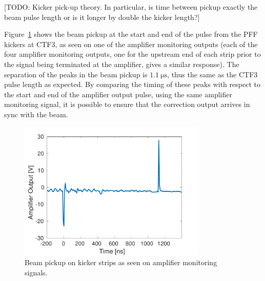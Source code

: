 [TODO: Kicker pick-up theory. In particular, is time between pickup exactly the beam pulse length or is it longer by double the kicker length?]

Figure~\ref{f:beamPickup_noKick} shows the beam pickup at the start and end of the pulse from the PFF kickers at CTF3, as seen on one of the amplifier monitoring outputs (each of the four amplifier monitoring outputs, one for the upstream end of each strip prior to the signal being terminated at the amplifier, gives a similar response). The separation of the peaks in the beam pickup is \(1.1~\mathrm{\mu s}\), thus the same as the CTF3 pulse length as expected. By comparing the timing of these peaks with respect to the start and end of the amplifier output pulse, using the same amplifier monitoring signal, it is possible to ensure that the correction output arrives in sync with the beam.

\begin{figure}
  \centering
  \includegraphics[width=0.8\textwidth]{Figures/commissioning/beamPickup_noKick}
  \caption{Beam pickup on kicker strips as seen on amplifier monitoring signals.}
  \label{f:beamPickup_noKick}
\end{figure}

